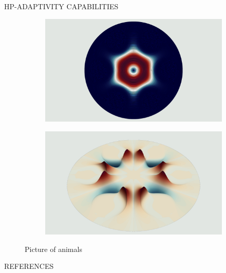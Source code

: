 \documentclass[debug]{beamer} %
\begin{document}
\begin{frame}
\begin{columns}
\begin{column}{0.45\textwidth}
{\begin{block}{\boxnumber HP-ADAPTIVITY CAPABILITIES }
\begin{figure}[hb]
\begin{mdframed}[backgroundcolor=bggrey]
					\begin{subfigure}[b]{.4999\textwidth}
						\centering
						\includegraphics[width=1\linewidth]{images/et2posterHoley.png}%
					\end{subfigure}\hfill
					\begin{subfigure}[b]{.4999\textwidth}
						\centering
						\includegraphics[width=1\linewidth]{images/ez2posterHoley.png}%
					\end{subfigure}
				\end{mdframed}
				\caption{Picture of animals}
				\label{fig:plot-holey}
			\end{figure}
        \end{block}

        \vfill
        \begin{block}{REFERENCES}
        	\printbibliography
        \end{block}
      } %
    \end{column}

  \end{columns}
\end{frame}
\end{document}
